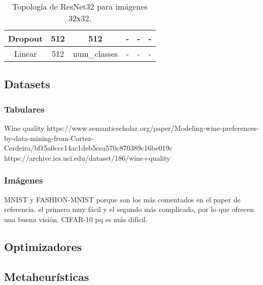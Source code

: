 \begin{table}[]
\begin{tabular}{|c|cc|c|cc|}
Dropout                        & \multicolumn{1}{c|}{512}     & 512          & -                                       & \multicolumn{1}{c|}{-}        &     -   \\ \hline
Linear                         & \multicolumn{1}{c|}{512}     & num\_classes & -                                       & \multicolumn{1}{c|}{-}        &   -     \\ \hline
\end{tabular}
\caption{Topología de ResNet32 para imágenes 32x32.}
\label{table:resnet32}
\end{table}


\subsection{Datasets}

\subsubsection{Tabulares}

Wine quality
https://www.semanticscholar.org/paper/Modeling-wine-preferences-by-data-mining-from-Cortez-Cerdeira/bf15a0ccc14ac1deb5cea570c870389c16be019c
https://archive.ics.uci.edu/dataset/186/wine+quality

\subsubsection{Imágenes}

MNIST y FASHION-MNIST porque son los más comentados en el paper de referencia. el primero muy fácil y el segundo más complicado, por lo que ofrecen una buena visión. CIFAR-10 pq es más difícil.

\subsection{Optimizadores}

\subsection{Metaheurísticas}
